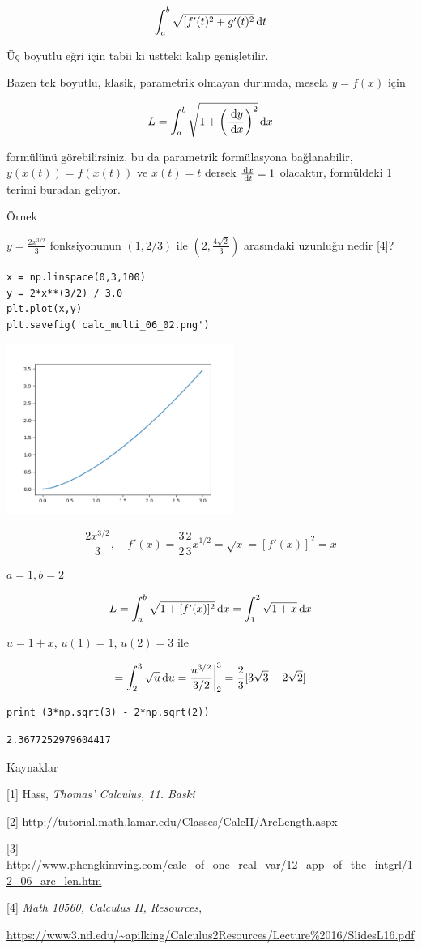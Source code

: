 \documentclass[12pt,fleqn]{article}\usepackage{../../common}
\begin{document}
$$
\int _{a}^{b} \sqrt{[f'(t)^2 + g'(t)^2} \,\mathrm{d} t
$$

Üç boyutlu eğri için tabii ki üstteki kalıp genişletilir.

Bazen tek boyutlu, klasik, parametrik olmayan durumda, mesela $y = f(x)$ için

$$
L = \int _{a}^{b} \sqrt{1 + \left( \frac{\,\mathrm{d} y}{\,\mathrm{d} x} \right)^2} \,\mathrm{d} x 
$$

formülünü görebilirsiniz, bu da parametrik formülasyona bağlanabilir, $y(x(t))
= f(x(t))$ ve $x(t) = t$ dersek $\frac{\,\mathrm{d} x}{\,\mathrm{d} t} = 1$ olacaktır,
formüldeki 1 terimi buradan geliyor.

Örnek

$y = \frac{2 x ^{3/2}}{3}$ fonksiyonunun $(1,2/3)$ ile $(2,\frac{4\sqrt{2}}{3})$ 
arasındaki uzunluğu nedir [4]? 

\begin{verbatim}
x = np.linspace(0,3,100)
y = 2*x**(3/2) / 3.0
plt.plot(x,y)
plt.savefig('calc_multi_06_02.png')
\end{verbatim}

\includegraphics[width=20em]{calc_multi_06_02.png}

$$
 \frac{2 x ^{3/2}}{3}, \quad f'(x) = \frac{3}{2} \frac{2}{3} x^{1/2} =
 \sqrt{x} = [f'(x)]^2 = x
$$

$a=1,b=2$

$$
L = \int _{a}^{b} \sqrt{ 1+ [f'(x)]^2} \,\mathrm{d} x = 
\int _{1}^{2} \sqrt{1 + x} \,\mathrm{d} x
$$

$u = 1 + x$, $u(1) = 1$, $u(2) = 3$ ile

$$
= \int _{2}^{3} \sqrt{u} \,\mathrm{d} u = \frac{u^{3/2}}{3/2} \bigg\vert _{2}^{3} = 
\frac{2}{3} [3 \sqrt{3} - 2\sqrt{2} ]
$$


\begin{verbatim}
print (3*np.sqrt(3) - 2*np.sqrt(2))
\end{verbatim}

\begin{verbatim}
2.3677252979604417
\end{verbatim}

Kaynaklar

[1] Hass, {\em Thomas' Calculus, 11. Baski}

[2] \url{http://tutorial.math.lamar.edu/Classes/CalcII/ArcLength.aspx}

[3] 
\url{http://www.phengkimving.com/calc_of_one_real_var/12_app_of_the_intgrl/12_06_arc_len.htm}

[4] {\em Math 10560, Calculus II, Resources}, 
    
\url{https://www3.nd.edu/~apilking/Calculus2Resources/Lecture%2016/SlidesL16.pdf}
\end{document}
